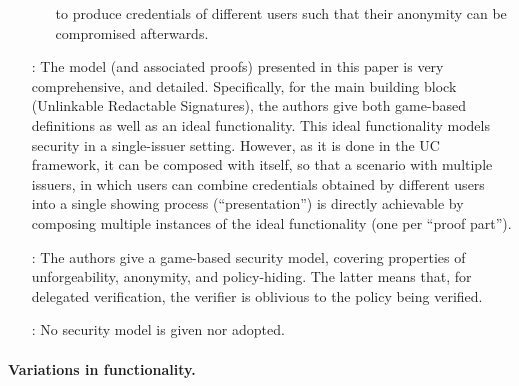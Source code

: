 \begin{enumerate}
\begin{itemize}
    to produce credentials of different users such that their anonymity can
    be compromised afterwards. 
  \end{itemize}
\item[\cite{cdhk15}:] The model (and associated proofs) presented in this paper
  is very comprehensive, and detailed. Specifically, for the main building block
  (Unlinkable Redactable Signatures), the authors give both game-based
  definitions as well as an ideal functionality. This ideal functionality models
  security in a single-issuer setting. However, as it is done in the UC
  framework, it can be composed with itself, so that a scenario with multiple
  issuers, in which users can combine credentials obtained by different users
  into a single showing process (``presentation'') is directly achievable by
  composing multiple instances of the ideal functionality (one per ``proof
  part'').
\item[\cite{dmm+18}:] The authors give a game-based security model, covering
  properties of unforgeability, anonymity, and policy-hiding. The latter
  means that, for delegated verification, the verifier is oblivious to the
  policy being verified.
\item[\cite{sms+19}:] No security model is given nor adopted.
\end{enumerate}

\paragraph{Variations in functionality.}

